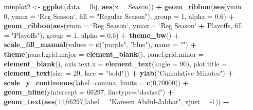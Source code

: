 \documentclass[]{book}
\newenvironment{Shaded}{\begin{snugshade}}{\end{snugshade}}
\newcommand{\DataTypeTok}[1]{\textcolor[rgb]{0.13,0.29,0.53}{#1}}
\newcommand{\DecValTok}[1]{\textcolor[rgb]{0.00,0.00,0.81}{#1}}
\newcommand{\FloatTok}[1]{\textcolor[rgb]{0.00,0.00,0.81}{#1}}
\newcommand{\KeywordTok}[1]{\textcolor[rgb]{0.13,0.29,0.53}{\textbf{#1}}}
\newcommand{\NormalTok}[1]{#1}
\newcommand{\OperatorTok}[1]{\textcolor[rgb]{0.81,0.36,0.00}{\textbf{#1}}}
\newcommand{\StringTok}[1]{\textcolor[rgb]{0.31,0.60,0.02}{#1}}
\begin{document}
\begin{Shaded}
\begin{Highlighting}[]
{{\NormalTok{minplot2 <-}\StringTok{ }\KeywordTok{ggplot}\NormalTok{(}\DataTypeTok{data =}\NormalTok{ lbj, }\KeywordTok{aes}\NormalTok{(}\DataTypeTok{x =}\NormalTok{ Season)) }\OperatorTok{+}\StringTok{ }
\StringTok{  }\KeywordTok{geom_ribbon}\NormalTok{(}\KeywordTok{aes}\NormalTok{(}\DataTypeTok{ymin =} \DecValTok{0}\NormalTok{, }\DataTypeTok{ymax =} \StringTok{`}\DataTypeTok{Reg Season}\StringTok{`}\NormalTok{, }\DataTypeTok{fill =} \StringTok{"Regular Season"}\NormalTok{), }
              \DataTypeTok{group =} \DecValTok{1}\NormalTok{, }\DataTypeTok{alpha =} \FloatTok{0.6}\NormalTok{) }\OperatorTok{+}\StringTok{ }
\StringTok{  }\KeywordTok{geom_ribbon}\NormalTok{(}\KeywordTok{aes}\NormalTok{(}\DataTypeTok{ymin =} \StringTok{`}\DataTypeTok{Reg Season}\StringTok{`}\NormalTok{, }\DataTypeTok{ymax =} \StringTok{`}\DataTypeTok{Reg Season}\StringTok{`} \OperatorTok{+}\StringTok{ }\NormalTok{Playoffs, }\DataTypeTok{fill =} \StringTok{"Playoffs"}\NormalTok{), }
              \DataTypeTok{group =} \DecValTok{1}\NormalTok{, }\DataTypeTok{alpha =} \FloatTok{0.6}\NormalTok{) }\OperatorTok{+}\StringTok{ }
\StringTok{  }\KeywordTok{theme_bw}\NormalTok{() }\OperatorTok{+}\StringTok{ }
\StringTok{  }\KeywordTok{scale_fill_manual}\NormalTok{(}\DataTypeTok{values =} \KeywordTok{c}\NormalTok{(}\StringTok{"purple"}\NormalTok{, }\StringTok{"blue"}\NormalTok{), }\DataTypeTok{name =} \StringTok{""}\NormalTok{) }\OperatorTok{+}
\StringTok{  }\KeywordTok{theme}\NormalTok{(}\DataTypeTok{panel.grid.major =} \KeywordTok{element_blank}\NormalTok{(), }\DataTypeTok{panel.grid.minor =} \KeywordTok{element_blank}\NormalTok{(), }
        \DataTypeTok{axis.text.x =} \KeywordTok{element_text}\NormalTok{(}\DataTypeTok{angle =} \DecValTok{90}\NormalTok{), }
        \DataTypeTok{plot.title =} \KeywordTok{element_text}\NormalTok{(}\DataTypeTok{size =} \DecValTok{20}\NormalTok{, }\DataTypeTok{face =} \StringTok{"bold"}\NormalTok{)) }\OperatorTok{+}
\StringTok{  }\KeywordTok{ylab}\NormalTok{(}\StringTok{"Cumulative Minutes"}\NormalTok{) }\OperatorTok{+}\StringTok{ }\KeywordTok{scale_y_continuous}\NormalTok{(}\DataTypeTok{label=}\NormalTok{comma, }\DataTypeTok{limits =} \KeywordTok{c}\NormalTok{(}\DecValTok{0}\NormalTok{,}\DecValTok{70000}\NormalTok{)) }\OperatorTok{+}
\StringTok{  }\KeywordTok{geom_hline}\NormalTok{(}\DataTypeTok{yintercept =} \DecValTok{66297}\NormalTok{, }\DataTypeTok{linetype=}\StringTok{"dashed"}\NormalTok{) }\OperatorTok{+}\StringTok{ }
\StringTok{  }\KeywordTok{geom_text}\NormalTok{(}\KeywordTok{aes}\NormalTok{(}\DecValTok{14}\NormalTok{,}\DecValTok{66297}\NormalTok{,}\DataTypeTok{label =} \StringTok{"Kareem Abdul-Jabbar"}\NormalTok{, }\DataTypeTok{vjust =} \DecValTok{-1}\NormalTok{)) }\OperatorTok{+}\StringTok{ }
}}
\end{Highlighting}
\end{Shaded}
\end{document}
